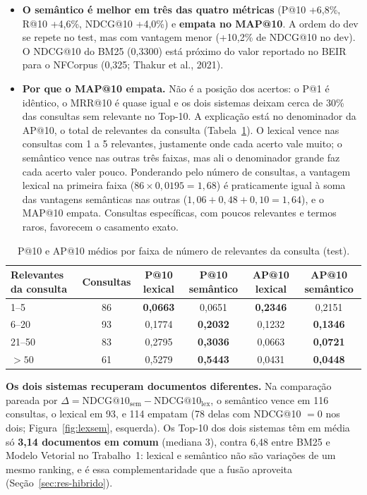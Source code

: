 \documentclass[10pt,a4paper]{article}
\begin{document}
\begin{itemize}
\item \textbf{O semântico é melhor em três das quatro métricas} (P@10 +6,8\%, R@10 +4,6\%, NDCG@10 +4,0\%) e \textbf{empata no MAP@10}. A ordem do dev se repete no test, mas com vantagem menor (+10,2\% de NDCG@10 no dev). O NDCG@10 do BM25 (0,3300) está próximo do valor reportado no BEIR para o NFCorpus (0,325; Thakur et al., 2021).
\item \textbf{Por que o MAP@10 empata.} Não é a posição dos acertos: o P@1 é idêntico, o MRR@10 é quase igual e os dois sistemas deixam cerca de 30\% das consultas sem relevante no Top-10. A explicação está no denominador da AP@10, o total de relevantes da consulta (Tabela~\ref{tab:faixas}). O lexical vence nas consultas com 1 a 5 relevantes, justamente onde cada acerto vale muito; o semântico vence nas outras três faixas, mas ali o denominador grande faz cada acerto valer pouco. Ponderando pelo número de consultas, a vantagem lexical na primeira faixa ($86 \times 0{,}0195 = 1{,}68$) é praticamente igual à soma das vantagens semânticas nas outras ($1{,}06 + 0{,}48 + 0{,}10 = 1{,}64$), e o MAP@10 empata. Consultas específicas, com poucos relevantes e termos raros, favorecem o casamento exato.
\end{itemize}

\begin{table}[!htb]
\centering\small
\caption{P@10 e AP@10 médios por faixa de número de relevantes da consulta (test).}
\label{tab:faixas}
\begin{tabular}{@{}lccccc@{}}
\toprule
Relevantes da consulta & Consultas & P@10 lexical & P@10 semântico & AP@10 lexical & AP@10 semântico \\
\midrule
1--5    & 86 & \textbf{0,0663} & 0,0651 & \textbf{0,2346} & 0,2151 \\
6--20   & 93 & 0,1774 & \textbf{0,2032} & 0,1232 & \textbf{0,1346} \\
21--50  & 83 & 0,2795 & \textbf{0,3036} & 0,0663 & \textbf{0,0721} \\
$> 50$  & 61 & 0,5279 & \textbf{0,5443} & 0,0431 & \textbf{0,0448} \\
\bottomrule
\end{tabular}
\end{table}

\textbf{Os dois sistemas recuperam documentos diferentes.} Na comparação pareada por $\Delta = \mathrm{NDCG@10}_{\text{sem}} - \mathrm{NDCG@10}_{\text{lex}}$, o semântico vence em 116 consultas, o lexical em 93, e 114 empatam (78 delas com NDCG@10 $= 0$ nos dois; Figura~\ref{fig:lexsem}, esquerda). Os Top-10 dos dois sistemas têm em média só \textbf{3,14 documentos em comum} (mediana 3), contra 6,48 entre BM25 e Modelo Vetorial no Trabalho~1: lexical e semântico não são variações de um mesmo ranking, e é essa complementaridade que a fusão aproveita (Seção~\ref{sec:res-hibrido}).
\end{document}

